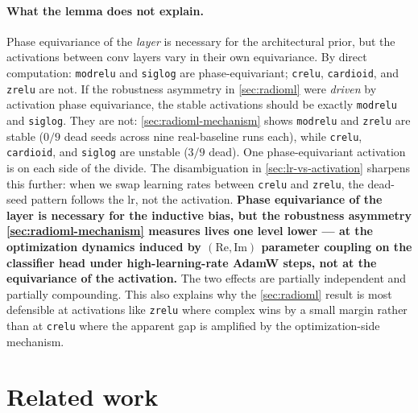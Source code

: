 \documentclass{article}
\providecommand{\Cref}[1]{\autoref{#1}}
\newcommand{\code}[1]{\texttt{#1}}
\begin{document}
\paragraph{What the lemma does not explain.}
Phase equivariance of the \emph{layer} is necessary for the
architectural prior, but the activations between conv layers vary in
their own equivariance. By direct computation: \code{modrelu} and
\code{siglog} are phase-equivariant; \code{crelu}, \code{cardioid},
and \code{zrelu} are not. If the robustness asymmetry in
\Cref{sec:radioml} were \emph{driven} by activation phase equivariance, the
stable activations should be exactly \code{modrelu} and \code{siglog}.
They are not: \Cref{sec:radioml-mechanism} shows \code{modrelu} and
\code{zrelu} are stable ($0/9$ dead seeds across nine real-baseline
runs each), while \code{crelu}, \code{cardioid}, and \code{siglog} are
unstable ($3/9$ dead). One phase-equivariant activation is on each
side of the divide. The disambiguation in \Cref{sec:lr-vs-activation}
sharpens this further: when we swap learning rates between
\code{crelu} and \code{zrelu}, the dead-seed pattern follows the lr,
not the activation. \textbf{Phase equivariance of the layer is
necessary for the inductive bias, but the robustness asymmetry
\Cref{sec:radioml-mechanism} measures lives one level lower --- at
the optimization dynamics induced by $(\mathrm{Re}, \mathrm{Im})$
parameter coupling on the classifier head under high-learning-rate AdamW steps,
not at the equivariance of the activation.} The two effects are
partially independent and partially compounding. This also explains why the
\Cref{sec:radioml} result is most defensible at activations like
\code{zrelu} where complex wins by a small margin rather than at
\code{crelu} where the apparent gap is amplified by the
optimization-side mechanism.

\section{Related work}
\label{sec:related-work}
\end{document}
